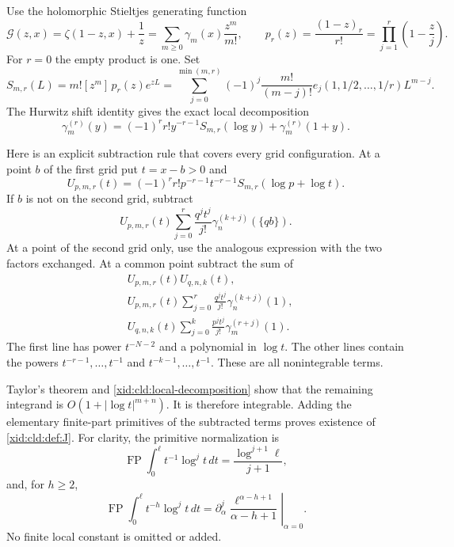 Use the holomorphic Stieltjes generating function
\[
 \mathscr G(z,x)=\zeta(1-z,x)+\frac1z
       =\sum_{m\ge0}\gamma_m(x)\frac{z^m}{m!},
 \qquad
 p_r(z)=\frac{(1-z)_r}{r!}
       =\prod_{j=1}^r\left(1-\frac zj\right).
\]
For $r=0$ the empty product is one.  Set
\begin{equation}
 S_{m,r}(L)=m![z^m]\,p_r(z)e^{zL}
 =\sum_{j=0}^{\min(m,r)}(-1)^j\frac{m!}{(m-j)!}
     e_j(1,1/2,\ldots,1/r)L^{m-j}.
 \label{xid:cld:S-polynomial}
\end{equation}
The Hurwitz shift identity gives the exact local decomposition
\begin{equation}
 \gamma_m^{(r)}(y)
 =(-1)^r r!y^{-r-1}S_{m,r}(\log y)
      +\gamma_m^{(r)}(1+y).
 \label{xid:cld:local-decomposition}
\end{equation}

Here is an explicit subtraction rule that covers every grid configuration.
At a point $b$ of the first grid put $t=x-b>0$ and
\[
 U_{p,m,r}(t)=(-1)^r r!p^{-r-1}t^{-r-1}
                     S_{m,r}(\log p+\log t).
\]
If $b$ is not on the second grid, subtract
\[
 U_{p,m,r}(t)\sum_{j=0}^r
       \frac{q^jt^j}{j!}\gamma_n^{(k+j)}(\{qb\}).
\]
At a point of the second grid only, use the analogous expression with
the two factors exchanged.  At a common point subtract the sum of
\begin{align}
 &U_{p,m,r}(t)U_{q,n,k}(t),\\
 &U_{p,m,r}(t)\sum_{j=0}^r
       \frac{q^jt^j}{j!}\gamma_n^{(k+j)}(1),\\
 &U_{q,n,k}(t)\sum_{j=0}^k
       \frac{p^jt^j}{j!}\gamma_m^{(r+j)}(1).
 \label{xid:cld:common-subtraction}
\end{align}
The first line has power $t^{-N-2}$ and a polynomial in $\log t$.
The other lines contain the powers $t^{-r-1},\ldots,t^{-1}$ and
$t^{-k-1},\ldots,t^{-1}$.  These are all nonintegrable terms.

Taylor's theorem and \eqref{xid:cld:local-decomposition} show that the
remaining integrand is $O(1+|\log t|^{m+n})$.  It is therefore integrable.
Adding the elementary finite-part primitives of the subtracted terms
proves existence of \eqref{xid:cld:def:J}.  For clarity, the primitive
normalization is
\[
 \operatorname{FP}\int_0^\ell t^{-1}\log^j t\,dt
      =\frac{\log^{j+1}\ell}{j+1},
\]
and, for $h\ge2$,
\[
 \operatorname{FP}\int_0^\ell t^{-h}\log^j t\,dt
 =\left.\partial_\alpha^j
       \frac{\ell^{\alpha-h+1}}{\alpha-h+1}\right|_{\alpha=0}.
\]
No finite local constant is omitted or added.

